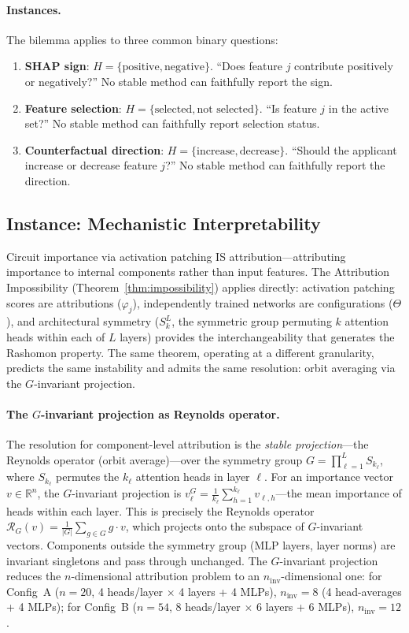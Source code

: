 \documentclass{article}
\begin{document}
\paragraph{Instances.}
The bilemma applies to three common binary questions:
\begin{enumerate}
\item \textbf{SHAP sign}: $H = \{\text{positive}, \text{negative}\}$. ``Does feature $j$ contribute positively or negatively?'' No stable method can faithfully report the sign.
\item \textbf{Feature selection}: $H = \{\text{selected}, \text{not selected}\}$. ``Is feature $j$ in the active set?'' No stable method can faithfully report selection status.
\item \textbf{Counterfactual direction}: $H = \{\text{increase}, \text{decrease}\}$. ``Should the applicant increase or decrease feature $j$?'' No stable method can faithfully report the direction.
\end{enumerate}

\subsection{Instance: Mechanistic Interpretability}
\label{sec:mech-interp}

Circuit importance via activation patching IS attribution---attributing importance to internal components rather than input features. The Attribution Impossibility (Theorem~\ref{thm:impossibility}) applies directly: activation patching scores are attributions ($\varphi_j$), independently trained networks are configurations ($\Theta$), and architectural symmetry ($S_k^L$, the symmetric group permuting $k$ attention heads within each of $L$ layers) provides the interchangeability that generates the Rashomon property. The same theorem, operating at a different granularity, predicts the same instability and admits the same resolution: orbit averaging via the $G$-invariant projection.

\paragraph{The $G$-invariant projection as Reynolds operator.}
The resolution for component-level attribution is the \emph{stable projection}---the Reynolds operator (orbit average)---over the symmetry group $G = \prod_{\ell=1}^{L} S_{k_\ell}$, where $S_{k_\ell}$ permutes the $k_\ell$ attention heads in layer $\ell$. For an importance vector $v \in \mathbb{R}^n$, the $G$-invariant projection is $v^G_\ell = \frac{1}{k_\ell} \sum_{h=1}^{k_\ell} v_{\ell,h}$---the mean importance of heads within each layer. This is precisely the Reynolds operator $\mathcal{R}_G(v) = \frac{1}{|G|} \sum_{g \in G} g \cdot v$, which projects onto the subspace of $G$-invariant vectors. Components outside the symmetry group (MLP layers, layer norms) are invariant singletons and pass through unchanged. The $G$-invariant projection reduces the $n$-dimensional attribution problem to an $n_{\text{inv}}$-dimensional one: for Config~A ($n=20$, 4 heads/layer $\times$ 4 layers + 4 MLPs), $n_{\text{inv}} = 8$ (4 head-averages + 4 MLPs); for Config~B ($n=54$, 8 heads/layer $\times$ 6 layers + 6 MLPs), $n_{\text{inv}} = 12$.
\end{document}
